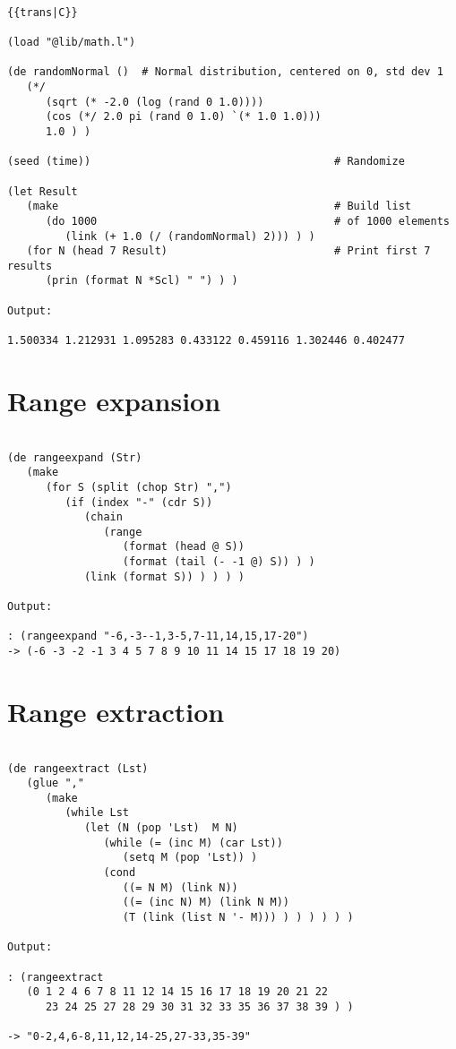 \begin{verbatim}

{{trans|C}}

(load "@lib/math.l")

(de randomNormal ()  # Normal distribution, centered on 0, std dev 1
   (*/
      (sqrt (* -2.0 (log (rand 0 1.0))))
      (cos (*/ 2.0 pi (rand 0 1.0) `(* 1.0 1.0)))
      1.0 ) )

(seed (time))                                      # Randomize

(let Result
   (make                                           # Build list
      (do 1000                                     # of 1000 elements
         (link (+ 1.0 (/ (randomNormal) 2))) ) )
   (for N (head 7 Result)                          # Print first 7 results
      (prin (format N *Scl) " ") ) )

Output:

1.500334 1.212931 1.095283 0.433122 0.459116 1.302446 0.402477

\end{verbatim}

\section*{Range expansion}

\begin{verbatim}

(de rangeexpand (Str)
   (make
      (for S (split (chop Str) ",")
         (if (index "-" (cdr S))
            (chain
               (range
                  (format (head @ S))
                  (format (tail (- -1 @) S)) ) )
            (link (format S)) ) ) ) )

Output:

: (rangeexpand "-6,-3--1,3-5,7-11,14,15,17-20")
-> (-6 -3 -2 -1 3 4 5 7 8 9 10 11 14 15 17 18 19 20)

\end{verbatim}

\section*{Range extraction}

\begin{verbatim}

(de rangeextract (Lst)
   (glue ","
      (make
         (while Lst
            (let (N (pop 'Lst)  M N)
               (while (= (inc M) (car Lst))
                  (setq M (pop 'Lst)) )
               (cond
                  ((= N M) (link N))
                  ((= (inc N) M) (link N M))
                  (T (link (list N '- M))) ) ) ) ) ) )

Output:

: (rangeextract
   (0 1 2 4 6 7 8 11 12 14 15 16 17 18 19 20 21 22
      23 24 25 27 28 29 30 31 32 33 35 36 37 38 39 ) )

-> "0-2,4,6-8,11,12,14-25,27-33,35-39"

\end{verbatim}

